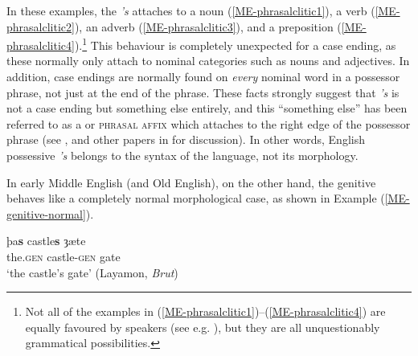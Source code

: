 \noindent In these examples, the \emph{'s} attaches to a noun (\ref{ME-phrasalclitic1}), a verb (\ref{ME-phrasalclitic2}), an adverb (\ref{ME-phrasalclitic3}), and a preposition (\ref{ME-phrasalclitic4}).\footnote{Not all of the examples in (\ref{ME-phrasalclitic1})--(\ref{ME-phrasalclitic4}) are equally favoured by speakers (see e.g. \citealp{BoerjarsEtal2013}), but they are all unquestionably grammatical possibilities.} This behaviour is completely unexpected for a case ending, as these normally only attach to nominal categories such as nouns and adjectives. In addition, case endings are normally found on \emph{every} nominal word in a possessor phrase, not just at the end of the phrase. These facts strongly suggest that \emph{'s} is not a case ending but something else entirely, and this ``something else'' has been referred to as a  or \textsc{phrasal affix} which attaches to the right edge of the possessor phrase (see \citealp{Anderson2013}, \citealp{BoerjarsEtal2013} and other papers in \citealp{BoerjarsDenisonScott2013book} for discussion). In other words, English possessive \emph{'s} belongs to the syntax of the language, not its morphology.

In early Middle English (and Old English), on the other hand, the genitive behaves like a completely normal morphological case, as shown in Example (\ref{ME-genitive-normal}).

\begin{exe}
\ex
\gll þa\textbf{s} castle\textbf{s} ȝæte\\
the.\textsc{gen} castle-\textsc{gen} gate\\
\trans `the castle's gate' \hfill (Layamon, \emph{Brut})
\label{ME-genitive-normal}
\end{exe}

